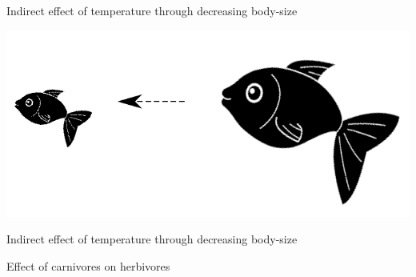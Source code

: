 \documentclass[11pt, compress, aspectratio=1610]{beamer}
\begin{document}
\begin{frame}{Indirect effect of temperature through decreasing
body-size}

\centering
\includegraphics[width=0.7\linewidth]{figuresAz/size.pdf}

\end{frame}

\begin{frame}{Indirect effect of temperature through decreasing
body-size}

\centering
Effect of carnivores on herbivores \vspace{1cm}


\end{frame}
\end{document}
